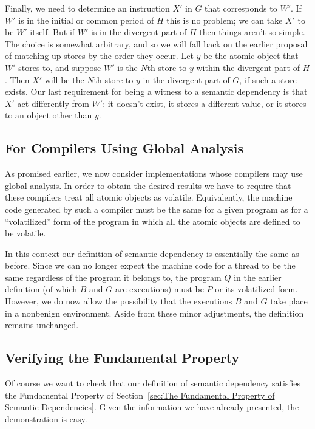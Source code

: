 Finally, we need to determine an instruction $X'$ in $G$ that
corresponds to $W'$.
If $W'$ is in the initial or common period of $H$ this is no
problem; we can take $X'$ to be $W'$ itself.
But if $W'$ is in the divergent part of $H$ then things aren't so
simple.
The choice is somewhat arbitrary, and so we will fall back on the
earlier proposal of matching up stores by the order they occur.
Let $y$ be the atomic object that $W'$ stores to, and suppose $W'$
is the $N$th store to $y$ within the divergent part of $H$.
Then $X'$ will be the $N$th store to $y$ in the divergent part
of $G$, if such a store exists.
Our last requirement for being a witness to a semantic dependency
is that $X'$ act differently from $W'$: it doesn't exist, it stores
a different value, or it stores to an object other than $y$.

\subsection{For Compilers Using Global Analysis}
\label{sec:For Compilers Using Global Analysis}

As promised earlier, we now consider implementations whose compilers
may use global analysis.
In order to obtain the desired results we have to require that these
compilers treat all atomic objects as volatile.
Equivalently, the machine code generated by such a compiler must be
the same for a given program as for a ``volatilized'' form of the
program in which all the atomic objects are defined to be volatile.

In this context our definition of semantic dependency is essentially
the same as before.
Since we can no longer expect the machine code for a thread to be the
same regardless of the program it belongs to, the program $Q$ in the
earlier definition (of which $B$ and $G$ are executions) must be
$P$ or its volatilized form.
However, we do now allow the possibility that the executions $B$ and
$G$ take place in a nonbenign environment.
Aside from these minor adjustments, the definition remains unchanged.

\subsection{Verifying the Fundamental Property}
\label{sec:Verifying the Fundamental Property}

Of course we want to check that our definition of semantic dependency
satisfies the Fundamental Property of
Section~\ref{sec:The Fundamental Property of Semantic Dependencies}.
Given the information we have already presented, the demonstration is
easy.

